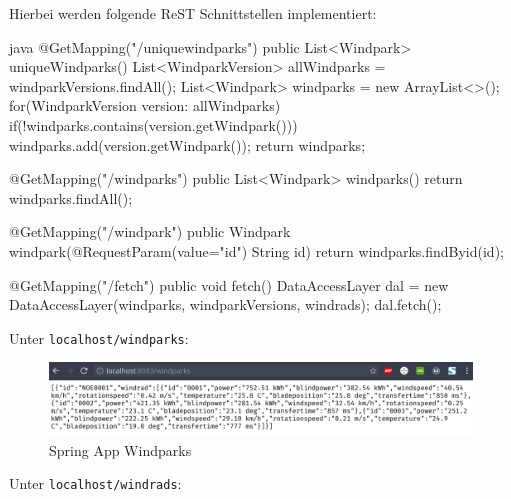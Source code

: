 Hierbei werden folgende ReST Schnittstellen implementiert:

\begin{code}{java}
    @GetMapping("/uniquewindparks")
    public List<Windpark> uniqueWindparks(){
        List<WindparkVersion> allWindparks = windparkVersions.findAll();
        List<Windpark> windparks = new ArrayList<>();
        for(WindparkVersion version: allWindparks){
            if(!windparks.contains(version.getWindpark())){
                windparks.add(version.getWindpark());
            }
        }
        return windparks;
    }

    @GetMapping("/windparks")
    public List<Windpark> windparks(){
        return windparks.findAll();
    }

    @GetMapping("/windpark")
    public Windpark windpark(@RequestParam(value="id") String id){
        return windparks.findByid(id);
    }

    @GetMapping("/fetch")
    public void fetch() {
        DataAccessLayer dal = new DataAccessLayer(windparks, windparkVersions, windrads);
        dal.fetch();
    }
\end{code}

Unter \texttt{localhost/windparks}:

\begin{figure}
    \caption{Spring App Windparks}
    \includegraphics[width=15cm]{images/spring-app-windparks}
    \centering
\end{figure}

Unter \texttt{localhost/windrads}:

